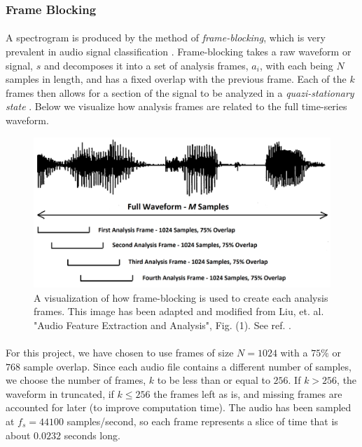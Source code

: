 \documentclass[12pt,letterpaper]{article}
\begin{document}
\subsubsection{Frame Blocking}
\label{subsubsec-FrameBlocking}

\paragraph*{}A spectrogram is produced by the method of \textit{frame-blocking}, which is very prevalent in audio signal classification \cite{Liu,Zhang}. Frame-blocking takes a raw waveform or signal, $s$ and decomposes it into a set of analysis frames, $a_i$, with each being $N$ samples in length, and has a fixed overlap with the previous frame. Each of the $k$ frames then allows for a section of the signal to be analyzed in a \textit{quazi-stationary state} \cite{Khan,Serizel}. Below we visualize how analysis frames are related to the full time-series waveform. 

\begin{figure}[H]
\begin{center}
\includegraphics[scale=0.45]{../Figures/AnalysisFrames}
\end{center}
\caption{A visualization of how frame-blocking is used to create each analysis frames. This image has been adapted and modified from Liu, et. al. "Audio Feature Extraction and Analysis", Fig. (1). See ref. \cite{Liu}.}
\label{fig-AnalysisFrames}
\end{figure}

\paragraph*{}For this project, we have chosen to use frames of size $N = 1024$ with a $75\%$ or $768$ sample overlap. Since each audio file contains a different number of samples, we choose the number of frames, $k$ to be less than or equal to $256$. If $k > 256$, the waveform in truncated, if $k \leq 256$ the frames left as is, and missing frames are accounted for later (to improve computation time). The audio has been sampled at $f_s = 44100$ samples/second, so each frame represents a slice of time that is about $0.0232$ seconds long.
\end{document}
